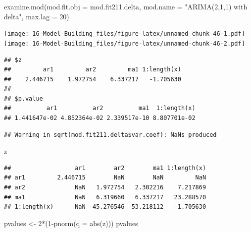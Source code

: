 \documentclass[
]{book}
\newenvironment{Shaded}{\begin{snugshade}}{\end{snugshade}}
\newcommand{\AttributeTok}[1]{\textcolor[rgb]{0.77,0.63,0.00}{#1}}
\newcommand{\DecValTok}[1]{\textcolor[rgb]{0.00,0.00,0.81}{#1}}
\newcommand{\FunctionTok}[1]{\textcolor[rgb]{0.00,0.00,0.00}{#1}}
\newcommand{\NormalTok}[1]{#1}
\newcommand{\OtherTok}[1]{\textcolor[rgb]{0.56,0.35,0.01}{#1}}
\newcommand{\SpecialCharTok}[1]{\textcolor[rgb]{0.00,0.00,0.00}{#1}}
\newcommand{\StringTok}[1]{\textcolor[rgb]{0.31,0.60,0.02}{#1}}
\theoremstyle{definition}
\theoremstyle{definition}
\theoremstyle{definition}
\theoremstyle{definition}
\theoremstyle{remark}
\begin{document}
\begin{Shaded}
\begin{Highlighting}[]
\FunctionTok{examine.mod}\NormalTok{(}\AttributeTok{mod.fit.obj =}\NormalTok{ mod.fit211.delta, }\AttributeTok{mod.name =} \StringTok{"ARIMA(2,1,1) with delta"}\NormalTok{, }\AttributeTok{max.lag =} \DecValTok{20}\NormalTok{)}
\end{Highlighting}
\end{Shaded}

\texttt{[image: 16-Model-Building\_files/figure-latex/unnamed-chunk-46-1.pdf]} \texttt{[image: 16-Model-Building\_files/figure-latex/unnamed-chunk-46-2.pdf]}

\begin{verbatim}
## $z
##         ar1         ar2         ma1 1:length(x) 
##    2.446715    1.972754    6.337217   -1.705630 
## 
## $p.value
##          ar1          ar2          ma1  1:length(x) 
## 1.441647e-02 4.852364e-02 2.339517e-10 8.807701e-02
\end{verbatim}

\begin{Shaded}
\end{Shaded}

\begin{verbatim}
## Warning in sqrt(mod.fit211.delta$var.coef): NaNs produced
\end{verbatim}

\begin{Shaded}
\begin{Highlighting}[]
\NormalTok{z}
\end{Highlighting}
\end{Shaded}

\begin{verbatim}
##                  ar1        ar2        ma1 1:length(x)
## ar1         2.446715        NaN        NaN         NaN
## ar2              NaN   1.972754   2.302216    7.217869
## ma1              NaN   6.319660   6.337217   23.288570
## 1:length(x)      NaN -45.276546 -53.218112   -1.705630
\end{verbatim}

\begin{Shaded}
\begin{Highlighting}[]
\NormalTok{pvalues }\OtherTok{\textless{}{-}} \DecValTok{2}\SpecialCharTok{*}\NormalTok{(}\DecValTok{1}\SpecialCharTok{{-}}\FunctionTok{pnorm}\NormalTok{(}\AttributeTok{q =} \FunctionTok{abs}\NormalTok{(z)))}
\NormalTok{pvalues}
\end{Highlighting}
\end{Shaded}
\end{document}
